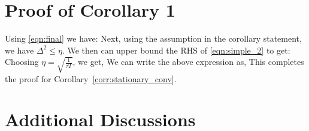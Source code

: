 
\newpage
\section{Proof of Corollary 1}
\label{app:corrolary_1}

Using \eqref{eqn:final} we have:
Next, using the assumption in the corollary statement, we have $\Delta^2 \leq \eta$. We then can upper bound the RHS of \eqref{eqn:simple_2} to get:
Choosing $\eta = \sqrt{\frac{1}{\tau T}}$, we get, 
We can write the above expression as, 
This completes the proof for Corollary~\ref{corr:stationary_conv}.


\newpage
\section{Additional Discussions}

